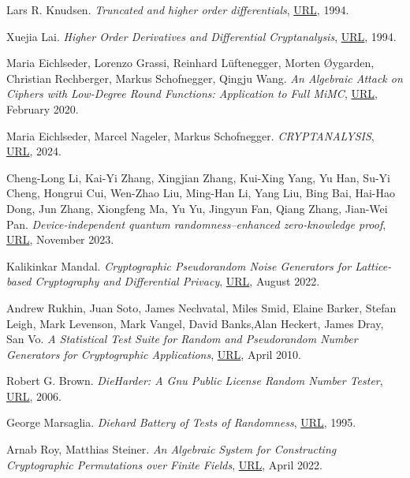 \documentclass{Resources/UoBLab1}
\theoremstyle{definition}
\begin{document}
\begin{thebibliography}{10}
 Lars R. Knudsen. \textit{Truncated and higher order differentials}, \href{https://link.springer.com/chapter/10.1007/3-540-60590-8_16}{URL}, 1994.

 Xuejia Lai. \textit{Higher Order Derivatives and Differential Cryptanalysis}, \href{https://link.springer.com/chapter/10.1007/978-1-4615-2694-0_23}{URL}, 1994.

 Maria Eichlseder, Lorenzo Grassi, Reinhard Lüftenegger, Morten Øygarden, Christian Rechberger, Markus Schofnegger, Qingju Wang. \textit{An Algebraic Attack on Ciphers with Low-Degree Round Functions: Application to Full MiMC}, \href{https://eprint.iacr.org/2020/182.pdf}{URL}, February 2020.

 Maria Eichlseder, Marcel Nageler, Markus Schofnegger. \textit{CRYPTANALYSIS}, \href{https://www.iaik.tugraz.at/course/cryptanalysis-705068-sommersemester-2024}{URL}, 2024.

 Cheng-Long Li, Kai-Yi Zhang, Xingjian Zhang, Kui-Xing Yang, Yu Han, Su-Yi Cheng, Hongrui Cui, Wen-Zhao Liu, Ming-Han Li, Yang Liu, Bing Bai, Hai-Hao Dong, Jun Zhang, Xiongfeng Ma, Yu Yu, Jingyun Fan, Qiang Zhang, Jian-Wei Pan. \textit{Device-independent quantum randomness–enhanced zero-knowledge proof}, \href{https://doi.org/10.1073/pnas.2205463120}{URL}, November 2023.

 Kalikinkar Mandal. \textit{Cryptographic Pseudorandom Noise Generators for Lattice-based Cryptography and Differential Privacy}, \href{https://ieeexplore.ieee.org/abstract/document/9870587/}{URL}, August 2022.

 Andrew Rukhin, Juan Soto, James Nechvatal, Miles Smid, Elaine Barker, Stefan Leigh, Mark Levenson, Mark Vangel, David Banks,Alan Heckert, James Dray, San Vo. \textit{A Statistical Test Suite for Random and Pseudorandom Number Generators for Cryptographic Applications}, \href{https://csrc.nist.gov/pubs/sp/800/22/r1/upd1/final}{URL}, April 2010.

 Robert G. Brown. \textit{DieHarder: A Gnu Public License Random Number Tester}, \href{https://rurban.github.io/dieharder/manual/dieharder.pdf}{URL}, 2006.

 George Marsaglia. \textit{Diehard Battery of Tests of Randomness}, \href{https://web.archive.org/web/20160125103112/http://stat.fsu.edu/pub/diehard/}{URL}, 1995.

 Arnab Roy, Matthias Steiner. \textit{An Algebraic System for Constructing Cryptographic Permutations over Finite Fields}, \href{https://arxiv.org/pdf/2204.01802v1.pdf}{URL}, April 2022.


\end{thebibliography}
\end{document}
